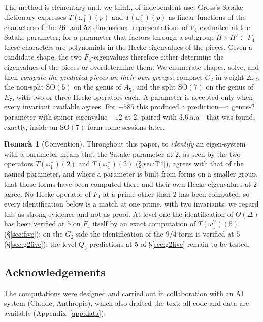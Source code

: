 \documentclass[11pt]{amsart}
\theoremstyle{definition}
\newtheorem{remark}[theorem]{Remark}
\begin{document}
The method is elementary and, we think, of independent use. Gross's Satake dictionary expresses $T(\omega_1^\vee)(p)$ and $T(\omega_4^\vee)(p)$ as linear functions of the characters of the $26$- and $52$-dimensional representations of $F_4$ evaluated at the Satake parameter; for a parameter that factors through a subgroup $H\times H'\subset F_4$ these characters are polynomials in the Hecke eigenvalues of the pieces. Given a candidate shape, the two $F_4$-eigenvalues therefore either determine the eigenvalues of the pieces or overdetermine them. We enumerate shapes, solve, and then \emph{compute the predicted pieces on their own groups}: compact $G_2$ in weight $2\omega_2$, the non-split $\mathrm{SO}(5)$ on the genus of $A_5$, and the split $\mathrm{SO}(7)$ on the genus of $E_7$, with two or three Hecke operators each. A parameter is accepted only when every invariant available agrees. For $-585$ this produced a prediction---a genus-$2$ parameter with spinor eigenvalue $-12$ at $2$, paired with \textsf{3.6.a.a}---that was found, exactly, inside an $\mathrm{SO}(7)$-form some sessions later.

\begin{remark}[Convention]\label{conv}
Throughout this paper, to \emph{identify} an eigen-system with a parameter means that the Satake parameter at $2$, as seen by the two operators $T(\omega_1^\vee)(2)$ and $T(\omega_4^\vee)(2)$ (\S\ref{sec:T4}), agrees with that of the named parameter, and where a parameter is built from forms on a smaller group, that those forms have been computed there and their own Hecke eigenvalues at $2$ agree. No Hecke operator of $F_4$ at a prime other than $2$ has been computed, so every identification below is a match at one prime, with two invariants; we regard this as strong evidence and not as proof. At level one the identification of $\Theta(\Delta)$ has been verified at $5$ on $F_4$ itself by an exact computation of $T(\omega_1^\vee)(5)$ (\S\ref{sec:five}); on the $G_2$ side the identification of the $9/4$-form is verified at $5$ (\S\ref{sec:g2five}); the level-$Q_3$ predictions at $5$ of \S\ref{sec:g2five} remain to be tested.
\end{remark}

\subsection*{Acknowledgements} The computations were designed and carried out in collaboration with an AI system (Claude, Anthropic), which also drafted the text; all code and data are available (Appendix~\ref{app:data}).
\end{document}
